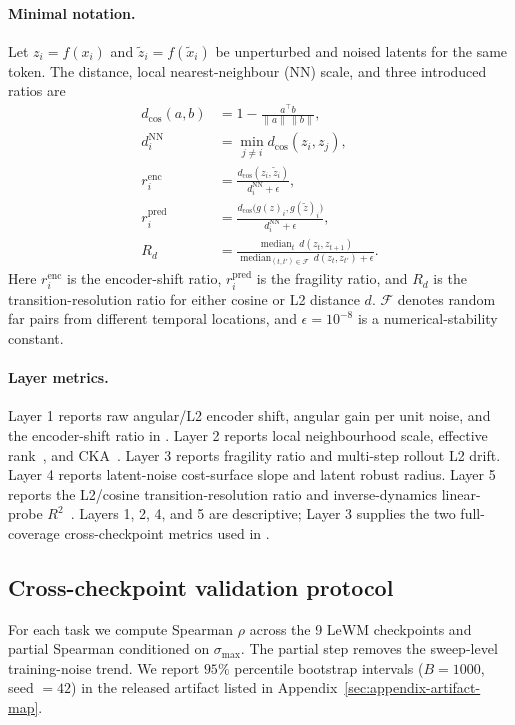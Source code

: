 \documentclass[10pt]{article}
\newcommand{\stdmax}{\ensuremath{\sigma_{\max}}}
\newcommand{\fragility}{fragility ratio}
\newcommand{\transres}{transition-resolution ratio}
\begin{document}
\paragraph{Minimal notation.} Let $z_i=f(x_i)$ and $\tilde z_i=f(\tilde x_i)$ be unperturbed and noised latents for the same token. The distance, local nearest-neighbour (NN) scale, and three introduced ratios are
\begin{equation}
\begin{aligned}
  d_{\cos}(a,b)
    &= 1-\frac{a^{\top}b}{\lVert a\rVert\,\lVert b\rVert},\\
  d_i^{\mathrm{NN}}
    &= \min_{j\ne i} d_{\cos}(z_i,z_j),\\
  r_i^{\mathrm{enc}}
    &= \frac{d_{\cos}(z_i,\tilde z_i)}{d_i^{\mathrm{NN}}+\epsilon},\\
  r_i^{\mathrm{pred}}
    &= \frac{d_{\cos}\!\big(g(z)_i, g(\tilde z)_i\big)}
            {d_i^{\mathrm{NN}}+\epsilon},\\
  R_d
    &= \frac{\operatorname{median}_{t}\, d(z_t,z_{t+1})}
            {\operatorname{median}_{(t,t')\in\mathcal{F}}\, d(z_t,z_{t'})+\epsilon}.
\end{aligned}
\label{eq:minimal-notation}
\end{equation}
Here $r_i^{\mathrm{enc}}$ is the encoder-shift ratio, $r_i^{\mathrm{pred}}$ is the \fragility{}, and $R_d$ is the \transres{} for either cosine or L2 distance $d$. $\mathcal{F}$ denotes random far pairs from different temporal locations, and $\epsilon=10^{-8}$ is a numerical-stability constant.

\paragraph{Layer metrics.} Layer 1 reports raw angular/L2 encoder shift, angular gain per unit noise, and the encoder-shift ratio in . Layer 2 reports local neighbourhood scale, effective rank~\cite{roy2007effrank}, and CKA~\cite{kornblith2019cka}. Layer 3 reports \fragility{} and multi-step rollout L2 drift. Layer 4 reports latent-noise cost-surface slope and latent robust radius. Layer 5 reports the L2/cosine \transres{} and inverse-dynamics linear-probe $R^2$~\cite{alain2017linearprobes}. Layers 1, 2, 4, and 5 are descriptive; Layer 3 supplies the two full-coverage cross-checkpoint metrics used in .

\subsection{Cross-checkpoint validation protocol}\label{sec:bg-cross-ckpt}
For each task we compute Spearman $\rho$ across the 9 LeWM checkpoints and partial Spearman conditioned on \stdmax{}. The partial step removes the sweep-level training-noise trend. We report $95\%$ percentile bootstrap intervals ($B=1000$, seed $=42$) in the released artifact listed in Appendix~\ref{sec:appendix-artifact-map}.
\end{document}
